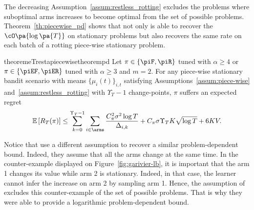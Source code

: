 The decreasing Assumption~\ref{assum:restless_rotting} excludes the problems where suboptimal arms increases to become optimal from the set of possible problems. Theorem~\ref{th:piecewise_pd} shows that not only \RAWUCB is able to recover the $\cO\pa{\log\pa{T}}$ on stationary problems but also recovers the same rate on each batch of a rotting piece-wise stationary problem. 
\begin{tBox}
\begin{restatable}{theoremeT}{restapiecewisetheorempd}
\label{th:piecewise_pd}
Let $\pi \in \left\{ \piF, \piR\right\}$ tuned with $\alpha \geq 4$ or $\pi \in \left\{ \piEF, \piER\right\}$ tuned with $\alpha \geq 3$ and $m=2$. For any piece-wise stationary bandit scenario with means $\{\mu_i(t)\}_{i,t}$ satisfying Assumptions~\ref{assum:piece-wise} and~\ref{assum:restless_rotting}  with $\Upsilon_T-1$ change-points, $\pi$ suffers an expected regret\,
\[
    \mathbb{E}\left[R_T(\pi)\right] \leq \sum_{k=0}^{\Upsilon_T-1} \sum_{i\in\arms} \frac{C_\pi^2 \sigma^2\log{T}}{\Delta_{i,k}} +  C_\pi \sigma \Upsilon_T K \sqrt{ \log{T}} + 6KV. 
\]
\end{restatable}
\end{tBox}

Notice that \citet{mukherjee2019distribution} use a different assumption to recover a similar problem-dependent bound. Indeed, they assume that all the arms change at the same time. In the counter-example displayed on Figure~\ref{fig:garivier-lb}, it is important that the arm 1 changes its value while arm 2 is stationary. Indeed, in that case, the learner cannot infer the increase on arm 2 by sampling arm 1. Hence, the assumption of \citet{mukherjee2019distribution} excludes this counter-example of the set of possible problems. That is why they were able to provide a logarithmic problem-dependent bound.  


